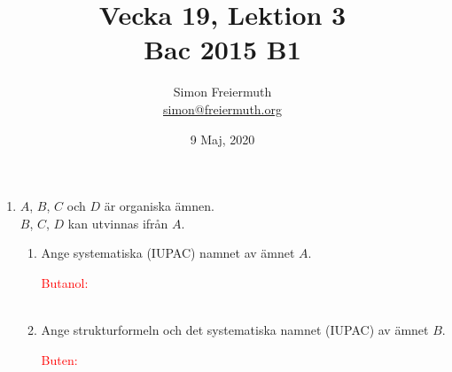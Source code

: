 \documentclass[12pt, letterpaper, twoside]{article}
\title{Vecka 19, Lektion 3\\ Bac 2015 B1}
\author{Simon Freiermuth \\ \href{mailto:simon@freiermuth.org}{simon@freiermuth.org}}
\date{9 Maj, 2020}
\begin{document}
\maketitle

\begin{flushleft}



\hfill

\begin{enumerate}[label=\textbf{\alph*)}]
    \item %
    $ A $, $ B $, $ C $ och $ D $ är organiska ämnen.\\
    $ B $, $ C $, $ D $ kan utvinnas ifrån $ A $.

    \hfill

    \begin{enumerate}[label=\textbf{\roman*. }]
        \item %
        Ange systematiska (IUPAC) namnet av ämnet $ A $.

        \textcolor{red}{
            Butanol:\\
           \hfill \\
        }

        \hfill %

        \item
        Ange strukturformeln och det systematiska namnet (IUPAC) av
        ämnet $ B $.

        \textcolor{red}{
            Buten: \\
            \hfill \\
        }


\end{enumerate}
\end{enumerate}
\end{flushleft}
\end{document}

